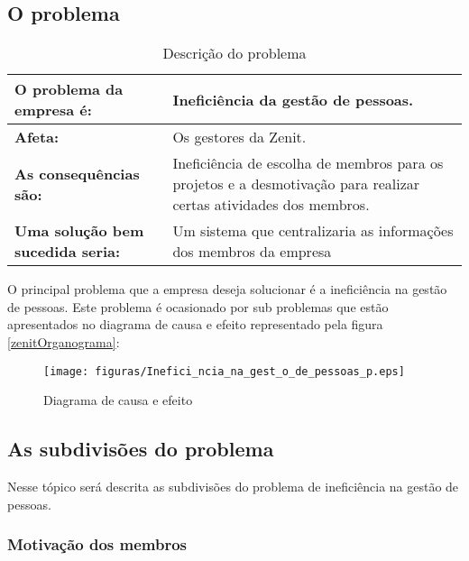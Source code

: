 \begin{anexosenv}
\section[O problema]{O problema}

\begin{table}[H]
    \centering
    \label{descricaodoprobelma}
    \caption{Descrição do problema}
    \begin{tabular}{|l|p{10cm}|}
        \hline
        \textbf{O problema da empresa é:} & Ineficiência da gestão de pessoas.\\
        \hline
        \textbf{Afeta:} & Os gestores da Zenit.\\
        \hline
        \textbf{As consequências são:} & Ineficiência de escolha de membros para os projetos e a desmotivação para realizar certas atividades dos membros.\\
        \hline
        \textbf{Uma solução bem sucedida seria:} & Um sistema que centralizaria as informações dos membros da empresa\\
        \hline
    \end{tabular}
\end{table}


O principal problema que a empresa deseja solucionar é a ineficiência na gestão de pessoas. Este problema é ocasionado por sub problemas que estão apresentados no diagrama de causa e efeito representado pela figura \ref{zenitOrganograma}:\\

\begin{figure}[H]
    \centering
    \texttt{[image: figuras/Inefici\_ncia\_na\_gest\_o\_de\_pessoas\_p.eps]}
    \caption{Diagrama de causa e efeito\label{causaEfeito}}
\end{figure}

\subsection[As subdivisões do problema]{As subdivisões do problema}


Nesse tópico será descrita as subdivisões do problema de ineficiência na gestão de pessoas.\\

\subsubsection[Motivação dos membros]{Motivação dos membros}


\end{anexosenv}
